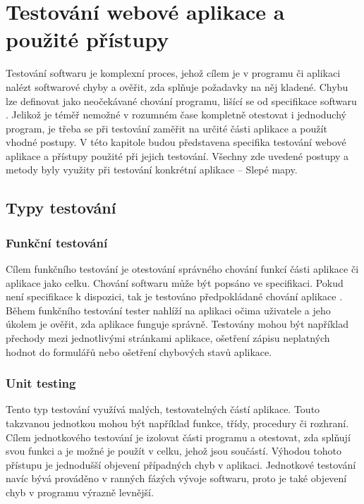 \documentclass[
    color,   %
	table,   %
    twoside, %
]{fithesis3}
\begin{document}
  \chapter{Testování webové aplikace a použité přístupy}
  Testování softwaru je komplexní proces, jehož cílem je v programu či aplikaci nalézt softwarové chyby a ověřit, zda splňuje požadavky na něj kladené. Chybu lze definovat jako neočekávané chování programu, lišící se od specifikace softwaru \cite{SoftwareISTQB}. Jelikož je téměř nemožné v rozumném čase kompletně otestovat i jednoduchý program, je třeba se při testování zaměřit na určité části aplikace a použít vhodné postupy. V této kapitole budou představena specifika testování webové aplikace a přístupy použité při jejich testování. Všechny zde uvedené postupy a metody byly využity při testování konkrétní aplikace –  Slepé mapy.
  
  \section{Typy testování}
  \subsection{Funkční testování}
  Cílem funkčního testování je otestování správného chování funkcí části aplikace či aplikace jako celku. Chování softwaru může být popsáno ve specifikaci. Pokud není specifikace k dispozici, tak je testováno předpokládané chování aplikace \cite{FunctionalISTQB}. Během funkčního testování tester nahlíží na aplikaci očima uživatele a jeho úkolem je ověřit, zda aplikace funguje správně. Testovány mohou být například přechody mezi jednotlivými stránkami aplikace, ošetření zápisu neplatných hodnot do formulářů nebo ošetření chybových stavů aplikace.
  
  \subsection{Unit testing}
  Tento typ testování využívá malých, testovatelných částí aplikace. Touto takzvanou jednotkou mohou být například funkce, třídy, procedury či rozhraní. Cílem jednotkového testování je izolovat části programu a otestovat, zda splňují svou funkci a je možné je použít v celku, jehož jsou součástí. Výhodou tohoto přístupu je jednodušší objevení případných chyb v aplikaci. Jednotkové testování navíc bývá prováděno v ranných fázých vývoje softwaru, proto je také objevení chyb v programu výrazně levnější.
  
\end{document}
